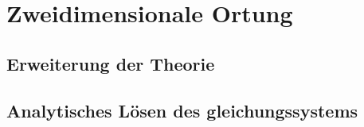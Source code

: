 \section{Zweidimensionale Ortung} 
      \subsection{Erweiterung der Theorie}
      \subsection{Analytisches Lösen des gleichungssystems}
